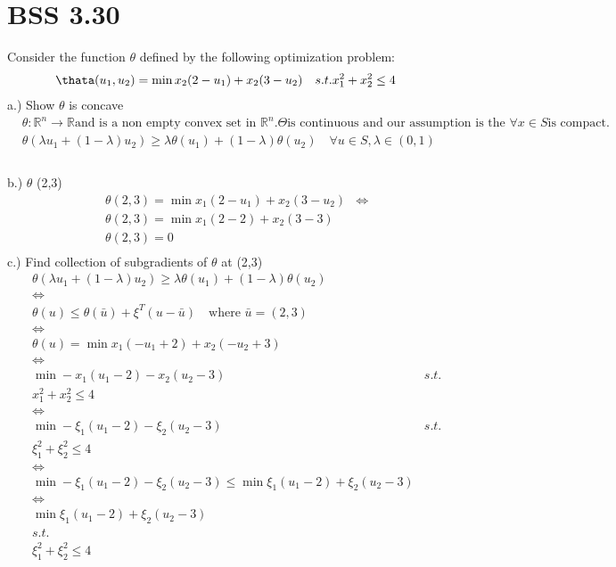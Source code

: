 \documentclass[12pt]{article}
\newcommand{\R}{\mathbb{R}}
\begin{document}
\section{BSS 3.30}
Consider the function $\theta$ defined by the following optimization problem: 
    \begin{align*}
        &\thata (u_1, u_2) = \min x_2(2-u_1) + x_2 (3-u_2)
        &s.t.
        &x_1^2 + x_2^2 \leq 4
    \end{align*}
a.) Show $\theta$ is concave
    \begin{align*}
        &\theta:\R^n \longrightarrow \R \text{and is a non empty convex set in } \R^n. \Theta \text{is continuous and our assumption is the } \forall x \in S \text{is compact.}\\ 
        &\theta (\lambda u_1 + (1-\lambda) u_2) \geq \lambda \theta(u_1) + (1-\lambda) \theta(u_2) \quad \forall u \in S, \lambda \in (0,1)\\
    \end{align*}\\
b.) $\theta$ (2,3)\\
    \begin{align*}
        &\theta (2,3) = \min x_1(2-u_1) + x_2 (3 - u_2) 
        &\Leftrightarrow\\
        &\theta (2,3) = \min x_1(2-2) + x_2 (3 - 3)\\
        &\theta (2,3) = 0 \\
    \end{align*}
c.) Find collection of subgradients of $\theta$ at (2,3)\\ 
    \begin{align*}
         &\theta (\lambda u_1 + (1-\lambda) u_2) \geq \lambda \theta(u_1) + (1-\lambda) \theta(u_2) \\ 
         &\Leftrightarrow\\
         &\theta (u) \leq \theta (\bar u) + \xi^T (u -\bar u) \quad \text{where } \bar u = (2,3)\\
         &\Leftrightarrow\\
         &\theta(u) = \min x_1 (-u_1 +2) + x_2 (-u_2 + 3) \\ 
         &\Leftrightarrow\\
         & \min -x_1(u_1 -2) -x_2 (u_2 -3) 
         &s.t.\\
         &x_1^2 + x_2^2 \leq 4\\
         &\Leftrightarrow\\
         & \min -\xi_1(u_1 -2) -\xi_2 (u_2 -3) 
         &s.t.\\
         &\xi_1^2 + \xi_2^2 \leq 4\\
         &\Leftrightarrow\\
         & \min -\xi_1(u_1 -2) -\xi_2 (u_2 -3) \leq \min \xi_1(u_1 -2) + \xi_2 (u_2 -3)\\
         &\Leftrightarrow\\
         &\min \xi_1(u_1 -2) + \xi_2 (u_2 -3)\\
         &s.t.\\
         &\xi_1^2 + \xi_2^2 \leq 4\\
    \end{align*}
\end{document}
